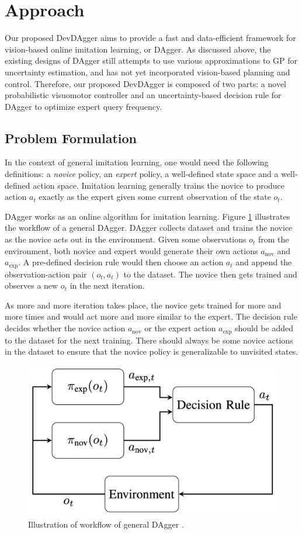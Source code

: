 \documentclass[11pt, reqno, letterpaper, twoside]{amsart}
\begin{document}
\section{Approach}
Our proposed DevDAgger aims to provide a fast and data-efficient framework for vision-based online imitation learning, or DAgger. As discussed above, the existing designs of DAgger still attempts to use various approximations to GP for uncertainty estimation, and has not yet incorporated vision-based planning and control. Therefore, our proposed DevDAgger is composed of two parts: a novel probabilistic visuomotor controller and an uncertainty-based decision rule for DAgger to optimize expert query frequency.

\subsection{Problem Formulation}
In the context of general imitation learning, one would need the following definitions: a \textit{novice} policy, an \textit{expert} policy, a well-defined state space and a well-defined action space. Imitation learning generally trains the novice to produce action $a_t$ exactly as the expert given some current observation of the state $o_t$.

DAgger works as an online algorithm for imitation learning. Figure \ref{fig:dagger_diagram} illustrates the workflow of a general DAgger. DAgger collects dataset and trains the novice as the novice acts out in the environment. Given some observations $o_t$ from the environment, both novice and expert would generate their own actions $a_\text{nov}$ and $a_\text{exp}$. A pre-defined decision rule would then choose an action $a_t$ and append the observation-action pair $(o_t,a_t)$ to the dataset. The novice then gets trained and observes a new $o_t$ in the next iteration.

As more and more iteration takes place, the novice gets trained for more and more times and would act more and more similar to the expert. The decision rule decides whether the novice action $a_\text{nov}$ or the expert action $a_\text{exp}$ should be added to the dataset for the next training. There should always be some novice actions in the dataset to ensure that the novice policy is generalizable to unvisited states.
\begin{figure}[htbp!]
	\centering
	\includegraphics[width=0.5\linewidth]{imgs/dagger_diagram.png}
	\caption{Illustration of workflow of general DAgger \cite{ensemble-dagger}.}
	\label{fig:dagger_diagram}
\end{figure}
\end{document}
